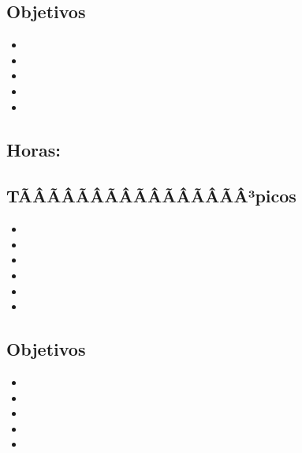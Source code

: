 \subsection*{Objetivos}
\begin{itemize}
	\item \ALCUATROObjUNO
	\item \ALCUATROObjDOS
	\item \ALCUATROObjTRES
	\item \ALCUATROObjCUATRO
	\item \ALCUATROObjCINCO
\end{itemize}

\subsection{\ALCINCODef}\label{sec:BOK-AL5}
\subsection*{Horas: \ALCINCOHours}

\subsection*{TÃÂÃÂÃÂÃÂÃÂÃÂÃÂÃÂ³picos}
\begin{itemize}
	\item \ALCINCOTopicMaquinas
	\item \ALCINCOTopicGramaticas
	\item \ALCINCOTopicProblemas
	\item \ALCINCOTopicFunciones
	\item \ALCINCOTopicEl
	\item \ALCINCOTopicImplicaciones
\end{itemize}

\subsection*{Objetivos}
\begin{itemize}
	\item \ALCINCOObjUNO
	\item \ALCINCOObjDOS
	\item \ALCINCOObjTRES
	\item \ALCINCOObjCUATRO
	\item \ALCINCOObjCINCO
\end{itemize}

\subsection{\ALSEISDef}\label{sec:BOK-AL6}

